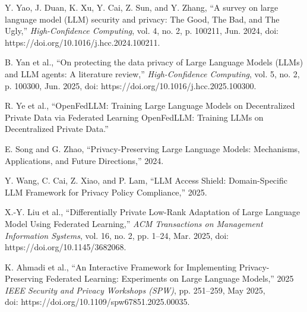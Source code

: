 \documentclass[12pt,a4paper]{report}
\begin{document}
\begin{enumerate}[label={[\arabic*]}]
    \item Y. Yao, J. Duan, K. Xu, Y. Cai, Z. Sun, and Y. Zhang, “A survey on large language model (LLM) security and privacy: The Good, The Bad, and The Ugly,” \textit{High-Confidence Computing}, vol. 4, no. 2, p. 100211, Jun. 2024, doi: https://doi.org/10.1016/j.hcc.2024.100211.

    \vspace{0.3cm}

    \item B. Yan et al., “On protecting the data privacy of Large Language Models (LLMs) and LLM agents: A literature review,” \textit{High-Confidence Computing}, vol. 5, no. 2, p. 100300, Jun. 2025, doi: https://doi.org/10.1016/j.hcc.2025.100300.

    \vspace{0.3cm}

    \item R. Ye et al., “OpenFedLLM: Training Large Language Models on Decentralized Private Data via Federated Learning OpenFedLLM: Training LLMs on Decentralized Private Data.”

    \vspace{0.3cm}

    \item E. Song and G. Zhao, “Privacy-Preserving Large Language Models: Mechanisms, Applications, and Future Directions,” 2024.

    \vspace{0.3cm}

    \item Y. Wang, C. Cai, Z. Xiao, and P. Lam, “LLM Access Shield: Domain-Specific LLM Framework for Privacy Policy Compliance,” 2025.

    \vspace{0.3cm}

    \item X.-Y. Liu et al., “Differentially Private Low-Rank Adaptation of Large Language Model Using Federated Learning,” \textit{ACM Transactions on Management Information Systems}, vol. 16, no. 2, pp. 1–24, Mar. 2025, doi: https://doi.org/10.1145/3682068.

    \vspace{0.3cm}

    \item K. Ahmadi et al., “An Interactive Framework for Implementing Privacy-Preserving Federated Learning: Experiments on Large Language Models,” 2025 \textit{IEEE Security and Privacy Workshops (SPW)}, pp. 251–259, May 2025,\\ doi: https://doi.org/10.1109/spw67851.2025.00035.


\end{enumerate}
\end{document}

